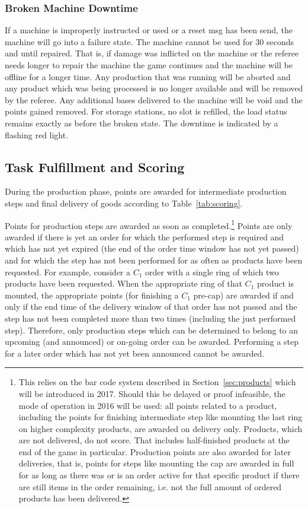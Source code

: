 \documentclass[12pt,twoside]{article}
\newcommand{\refsec}[1]{Section~\ref{#1}}
\newcommand{\reftab}[1]{Table~\ref{#1}}
\begin{document}
\subsubsection{Broken Machine Downtime}
\label{sec:broken-machine}
If a machine is improperly instructed or used or a reset msg has been
send, the machine will go into a failure state. The machine cannot be
used for 30 seconds and until repaired. That is, if damage was
inflicted on the machine or the referee needs longer to repair the
machine the game continues and the machine will be offline for a
longer time. Any production that was running will be aborted and any
product which was being processed is no longer available and will be
removed by the referee. Any additional bases delivered to the machine
will be void and the points gained removed. For storage stations, no
slot is refilled, the load status remains exactly as before the broken
state. The downtime is indicated by a flashing red light.

\subsection{Task Fulfillment and Scoring}
\label{sec:production-scoring}
During the production phase, points are awarded for intermediate
production steps and final delivery of goods according to
\reftab{tab:scoring}.

Points for production steps are awarded as soon as
completed.\footnote{This relies on the bar code system described in
  \refsec{sec:products} which will be introduced in 2017. Should this
  be delayed or proof infeasible, the mode of operation in 2016 will
  be used: all points related to a product, including the points for
  finishing intermediate step like mounting the last ring on higher
  complexity products, are awarded on delivery only. Products, which
  are not delivered, do not score. That includes half-finished
  products at the end of the game in particular. Production points are
  also awarded for later deliveries, that is, points for steps like
  mounting the cap are awarded in full for as long as there was or is
  an order active for that specific product if there are still items
  in the order remaining, i.e. not the full amount of ordered products
  has been delivered.}
%
Points are only awarded if there is yet an order for which the
performed step is required and which has not yet expired (the end of
the order time window has not yet passed) and for which the step has
not been performed for as often as products have been requested. For
example, consider a $C_1$ order with a single ring of which two
products have been requested. When the appropriate ring of that $C_1$
product is mounted, the appropriate points (for finishing a $C_1$
pre-cap) are awarded if and only if the end time of the delivery
window of that order has not passed and the step has not been
completed more than two times (including the just performed
step). Therefore, only production steps which can be determined to
belong to an upcoming (and announced) or on-going order can be
awarded. Performing a step for a later order which has not yet been
announced cannot be awarded.
\end{document}
